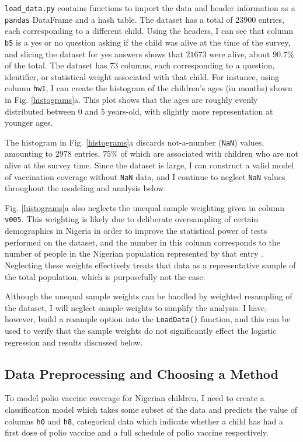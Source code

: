 \documentclass[prl,onecolumn,amsmath,amssymb,superscriptaddress,notitlepage]{revtex4-1}
\begin{document}
\verb|load_data.py| contains functions to import the data and header information as a \verb|pandas| DataFrame and a hash table. The dataset has a total of $23900$ entries, each corresponding to a different child. Using the headers, I can see that column \verb|b5| is a yes or no question asking if the child was alive at the time of the survey, and slicing the dataset for yes answers shows that $21673$ were alive, about $90.7\%$ of the total. The dataset has $73$ columns, each corresponding to a question, identifier, or statistical weight associated with that child. For instance, using column \verb|hw1|, I can create the histogram of the children's ages (in months) shown in Fig. \ref{histograms}a. This plot shows that the ages are roughly evenly distributed between $0$ and $5$ years-old, with slightly more representation at younger ages. 

The histogram in Fig. \ref{histograms}a discards not-a-number (\verb|NaN|) values, amounting to $2978$ entries, $75\%$ of which are associated with children who are not alive at the survey time. Since the dataset is large, I can construct a valid model of vaccination coverage without \verb|NaN| data, and I continue to neglect \verb|NaN| values throughout the modeling and analysis below.

Fig. \ref{histograms}a also neglects the unequal sample weighting given in column \verb|v005|. This weighting is likely due to deliberate oversampling of certain demographics in Nigeria in order to improve the statistical power of tests performed on the dataset, and the number in this column corresponds to the number of people in the Nigerian population represented by that entry \cite{downey2014}. Neglecting these weights effectively treats that data as a representative sample of the total population, which is purposefully not the case. 

Although the unequal sample weights can be handled by weighted resampling of the dataset, I will neglect sample weights to simplify the analysis. I have, however, build a resample option into the \verb|LoadData()| function, and this can be used to verify that the sample weights do not significantly effect the logistic regression and results discussed below. 


\subsection{Data Preprocessing and Choosing a Method}

To model polio vaccine coverage for Nigerian children, I need to create a classification model which takes some subset of the data and predicts the value of columns \verb|h0| and \verb|h8|, categorical data which indicate whether a child has had a first dose of polio vaccine and a full schedule of polio vaccine respectively. 
\end{document}
